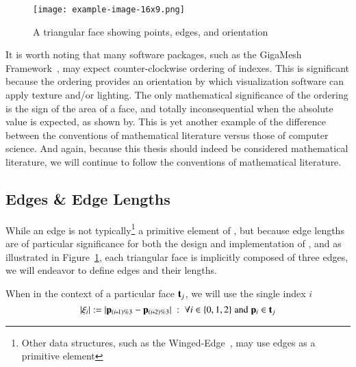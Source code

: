 \begin{figure}[ht]
\ffigbox
	{\texttt{[image: example-image-16x9.png]}}
	{\caption[A Triangular Face]{A triangular face showing points, edges, and orientation}\label{fig:facesOfAMesh}}
\end{figure}%

It is worth noting that many software packages, such as the GigaMesh Framework~\cite[p.~89]{Mara12}, may expect counter-clockwise ordering of indexes.  This is significant because the ordering provides an orientation by which visualization software can apply texture and/or lighting. The only mathematical significance of the ordering is the sign of the area of a face, and totally inconsequential when the absolute value is expected, as shown by\cite[p.~2]{Braden86}. This is yet another example of the difference between the conventions of mathematical literature versus those of computer science. And again, because this thesis should indeed be considered mathematical literature, we will continue to follow the conventions of mathematical literature.
%
\subsection{Edges \& Edge Lengths}
\label{chBsEEL}
While an edge is not typically\footnote{Other data structures, such as the Winged-Edge~\cite[p.~1]{Baumgart75}, may use edges as a primitive element} a primitive element of \tdd{}, but because edge lengths are of particular significance for both the design and implementation of , and as illustrated in Figure~\ref{fig:facesOfAMesh}, each triangular face is implicitly composed of three edges, we will endeavor to define edges and their lengths.

When in the context of a particular face $\mathbf{t}_j$, we will use the single index $i$
\begin{equation}
	|\xi_i| := |\bp_{(\sipo)\%3} - \bp_{(\sipt)\%3}| \;:\; \forall i \in\{0,1,2\} \;\text{and}\; \bp_i \in \bt_j
	\label{eq:defineEdgeLengthFace}
\end{equation}%
%

